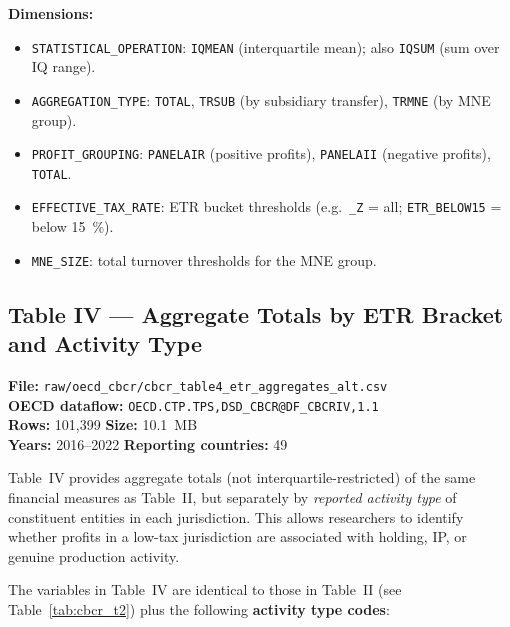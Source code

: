 \documentclass[11pt,a4paper]{article}
\begin{document}
\noindent\textbf{Dimensions:}
\begin{itemize}[noitemsep]
    \item \texttt{STATISTICAL\_OPERATION}: \texttt{IQMEAN} (interquartile mean);
    also \texttt{IQSUM} (sum over IQ range).
    \item \texttt{AGGREGATION\_TYPE}: \texttt{TOTAL}, \texttt{TRSUB} (by
    subsidiary transfer), \texttt{TRMNE} (by MNE group).
    \item \texttt{PROFIT\_GROUPING}: \texttt{PANELAIR} (positive profits),
    \texttt{PANELAII} (negative profits), \texttt{TOTAL}.
    \item \texttt{EFFECTIVE\_TAX\_RATE}: ETR bucket thresholds
    (e.g.\ \texttt{\_Z} = all; \texttt{ETR\_BELOW15} = below 15~\%).
    \item \texttt{MNE\_SIZE}: total turnover thresholds for the MNE group.
\end{itemize}

\subsection{Table IV --- Aggregate Totals by ETR Bracket and Activity Type}
\label{subsec:cbcr_t4}

\textbf{File:} \texttt{raw/oecd\_cbcr/cbcr\_table4\_etr\_aggregates\_alt.csv}\\
\textbf{OECD dataflow:} \texttt{OECD.CTP.TPS,DSD\_CBCR@DF\_CBCRIV,1.1}\\
\textbf{Rows:} 101{,}399 \quad \textbf{Size:} 10.1~MB\\
\textbf{Years:} 2016--2022 \quad \textbf{Reporting countries:} 49

Table~IV provides aggregate totals (not interquartile-restricted) of the same
financial measures as Table~II, but separately by \emph{reported activity type}
of constituent entities in each jurisdiction.  This allows researchers to
identify whether profits in a low-tax jurisdiction are associated with holding,
IP, or genuine production activity.

The variables in Table~IV are identical to those in Table~II
(see Table~\ref{tab:cbcr_t2}) plus the following \textbf{activity type codes}:
\end{document}
